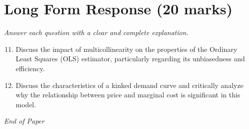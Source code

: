 \documentclass[12pt]{article}
\begin{document}
\section*{Long Form Response (20 marks)}
\textit{Answer each question with a clear and complete explanation.}
\begin{enumerate}[label=\arabic*.]
\setcounter{enumi}{10}
\item Discuss the impact of multicollinearity on the properties of the Ordinary Least Squares (OLS) estimator, particularly regarding its unbiasedness and efficiency.
\item Discuss the characteristics of a kinked demand curve and critically analyze why the relationship between price and marginal cost is significant in this model.
\end{enumerate}

\vfill
\noindent\textit{End of Paper}
\end{document}
